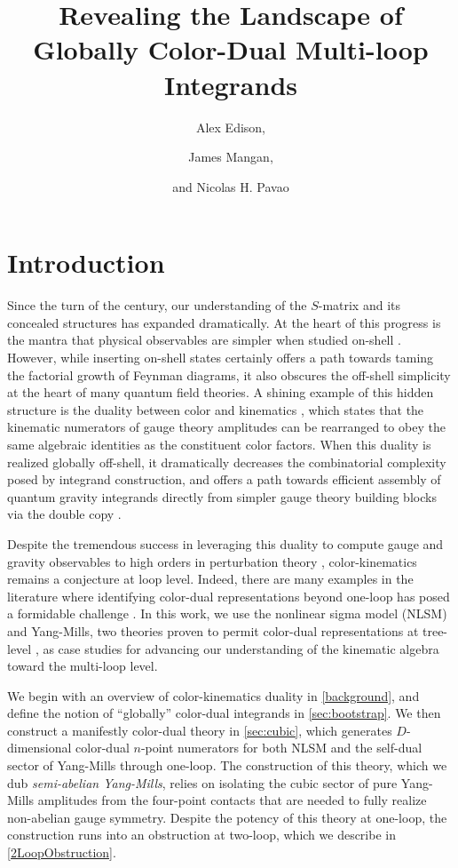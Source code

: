 \documentclass[11pt,letter]{article}
\author{\large Alex Edison,}
\author{\large James Mangan,}
\author{\large and Nicolas H. Pavao}
\affiliation{Department of Physics and Astronomy, Northwestern
  University, Evanston, Illinois 60208, USA}
\title{\center  \fontsize{18}{20} \selectfont  Revealing the Landscape of Globally Color-Dual Multi-loop Integrands}
\begin{document}
\maketitle
\flushbottom
 

\section{Introduction}\label{intro}
Since the turn of the century, our understanding of the $S$-matrix and
its concealed structures has expanded dramatically. At the heart of this
progress is the mantra that physical observables are simpler when
studied on-shell
\cite{Parke:1986gb,TasiLance,Cheung:2017pzi}. However, while inserting on-shell states certainly offers a path towards taming the
factorial growth of Feynman diagrams, it also obscures the off-shell
simplicity at the heart of many quantum field theories. A shining
example of this hidden structure is the duality between color and
kinematics \cite{BCJ,Bern:2010ue,BCJreview}, which states that the
kinematic numerators of gauge theory amplitudes can be rearranged to
obey the same algebraic identities as the constituent color
factors. When this duality is realized globally off-shell, it
dramatically decreases the combinatorial complexity posed by integrand
construction, and offers a path towards efficient assembly of quantum
gravity integrands directly from simpler gauge theory building blocks
via the double copy \cite{BCJ,Bern:2010ue}.

Despite the tremendous success in leveraging this duality to
compute gauge and gravity observables to high orders in perturbation
theory \cite{FiveLoopN4, GeneralizedDoubleCopyFiveLoops, Bern:2018jmv,
  Carrasco:2021otn}, color-kinematics remains a conjecture at loop
level. Indeed, there are many examples in the literature where
identifying color-dual representations beyond one-loop has posed a
formidable challenge
\cite{Mogull:2015adi, Johansson:2017bfl, KalinN2TwoLoop, Bern:2015ooa}. In this work, we use
the nonlinear sigma model (NLSM) and Yang-Mills, two theories proven
to permit color-dual representations at tree-level
\cite{Feng:2010my,Cachazo:2014xea}, as case studies for advancing our
understanding of the kinematic algebra toward the multi-loop level.

We begin with an overview of color-kinematics duality in
\cref{background}, and define the notion of ``globally'' color-dual integrands in \cref{sec:bootstrap}. 
We then construct a manifestly color-dual theory in
\cref{sec:cubic}, which generates $D$-dimensional color-dual $n$-point
numerators for both NLSM and the self-dual sector of Yang-Mills
through one-loop. The construction of this theory, which we dub
\textit{semi-abelian Yang-Mills}, relies on isolating the cubic sector
of pure Yang-Mills amplitudes from the four-point contacts that are
needed to fully realize non-abelian gauge symmetry. Despite the
potency of this theory at one-loop, the construction runs into an
obstruction at two-loop, which we describe in \cref{2LoopObstruction}.
\end{document}

